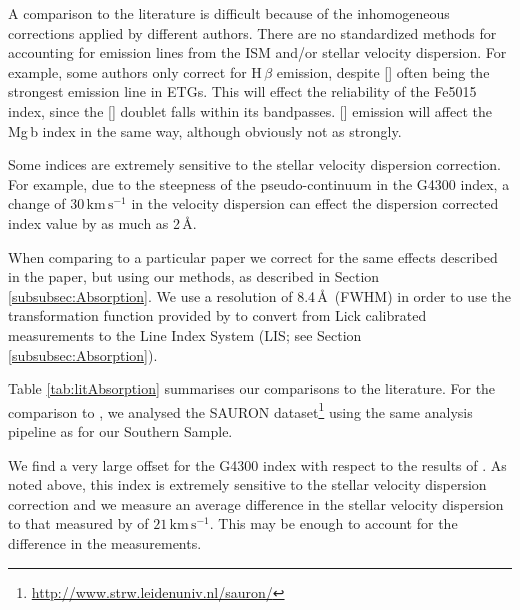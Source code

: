 			A comparison to the literature is difficult because of the inhomogeneous corrections applied by different authors. There are no standardized methods for accounting for emission lines from the ISM and/or stellar velocity dispersion. For example, some authors only correct for H\,$\beta$ emission, despite [] often being the strongest emission line in ETGs. This will effect the reliability of the Fe5015 index, since the [] doublet falls within its bandpasses. [] emission will affect the Mg\,b index in the same way, although obviously not as strongly.

			Some indices are extremely sensitive to the stellar velocity dispersion correction. For example, due to the steepness of the pseudo-continuum in the G4300 index, a change of $30 \, \mathrm{km\,s^{-1}}$ in the velocity dispersion can effect the dispersion corrected index value by as much as 2\,\AA.

			When comparing to a particular paper we correct for the same effects described in the paper, but using our methods, as described in Section \ref{subsubsec:Absorption}. We use a resolution of 8.4\,\AA\ (FWHM) in order to use the transformation function provided by \citet{Vazdekis2010} to convert from Lick calibrated measurements to the Line Index System (LIS; see Section \ref{subsubsec:Absorption}). 

			Table \ref{tab:litAbsorption} summarises our comparisons to the literature. For the comparison to \citet{Vazdekis2010}, we analysed the SAURON dataset\footnote{\url{http://www.strw.leidenuniv.nl/sauron/}} \citep{Emsellem2004} using the same analysis pipeline as for our Southern Sample. 

			We find a very large offset for the G4300 index with respect to the results of \citet{Rampazzo2005}. As noted above, this index is extremely sensitive to the stellar velocity dispersion correction and we measure an average difference in the stellar velocity dispersion to that measured by \citet{Rampazzo2005} of $21\,\mathrm{km\,s^{-1}}$. This may be enough to account for the difference in the measurements.

